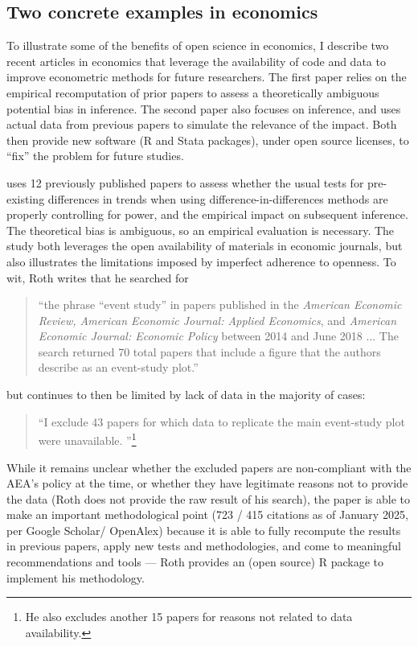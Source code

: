 \documentclass{article}
\begin{document}
\subsection{Two concrete examples in economics}

To illustrate some of the benefits of open science in economics, I describe two recent articles in economics that leverage the availability of code and data to improve econometric methods for future researchers. The first paper relies on the empirical recomputation of prior papers to assess a theoretically ambiguous potential bias in inference. The second paper also focuses on inference, and uses actual data from previous papers to simulate the relevance of the impact. Both then provide new software (R and Stata packages), under open source licenses, to ``fix'' the problem for future studies. 

\citet{roth_pretest_2022}  uses 12 previously published papers to assess whether the usual tests for pre-existing differences in trends when using difference-in-differences methods are properly controlling for power, and the empirical impact on subsequent inference. The theoretical bias is ambiguous, so an empirical evaluation is necessary. The study both leverages the open availability of materials in economic journals, but also illustrates the limitations imposed by imperfect adherence to openness. To wit, Roth writes that he searched for 

\begin{quote}
``the phrase “event study” in papers published in the \textit{American Economic Review, American Economic Journal: Applied Economics}, and \textit{American Economic Journal: Economic Policy} between
2014 and June 2018 ... The search returned 70 total papers that include a figure that the authors describe as an event-study plot.''
\end{quote}

but continues to then be limited by lack of data in the majority of cases:

\begin{quote}
    ``I exclude 43 papers for which data to replicate the main event-study plot were unavailable. \citep[pg. 307]{roth_pretest_2022}''\footnote{He also excludes another 15 papers for reasons not related to data availability.}
\end{quote}

While it remains unclear whether the excluded papers are non-compliant with the AEA's policy at the time, or whether they have legitimate reasons not to provide the data (Roth does not provide the raw result of his search), the paper is able to make an important methodological point (723 / 415 citations as of January 2025, per Google Scholar/ OpenAlex) because it is able to fully recompute the results in previous papers, apply new tests and methodologies, and come to meaningful recommendations and tools --- Roth provides an (open source) R package to implement his methodology.
\end{document}
